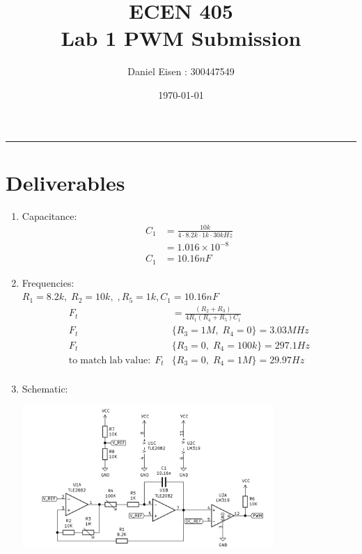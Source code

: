 \documentclass[11pt]{article}
\title{ECEN 405 \\ Lab 1 PWM Submission}
\author{Daniel Eisen : 300447549}
\date{\today}
\begin{document}
\begin{preview}

      \maketitle
      \hrule
      \section*{Deliverables}
      \begin{enumerate}
            \item Capacitance:
                  \begin{align*}
                        C_{1} &= \frac{10k}{4{\cdot}8.2k{\cdot}1k{\cdot}30kHz} \\
                              &= 1.016{\times}10^{-8} \\
                        C_{1} &= 10.16nF      
                  \end{align*}
            \item Frequencies: \\
            $R_{1}=8.2k, \; R_{2}=10k, \; , R_{5}=1k, C_{1}=10.16nF$
            \begin{align*}
                        F_{t} &= \frac{(R_{2}+R_{3})}{4R_{1}(R_{4}+R_{5})C_{1}}\\       
                        F_{t}&\{R_{3}=1M ,\; R_{4}=0\} = 3.03MHz \\
                        F_{t}&\{R_{3}=0 ,\; R_{4}=100k\} = 297.1Hz \\
                        \mathrm{to \; match \; lab \; value: \;} F_{t}&\{R_{3}=0 ,\; R_{4}=1M\} = 29.97Hz \\
                  \end{align*}
            \item Schematic:
                  \begin{center}
                        \includegraphics[width=0.75\textwidth]{img/PWM_gen.png}

\end{center}
\end{enumerate}
\end{preview}
\end{document}
